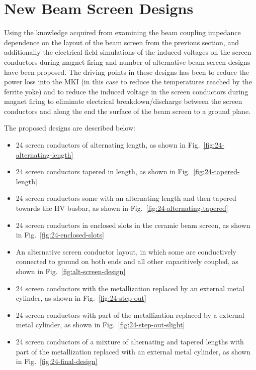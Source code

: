\section{New Beam Screen Designs}

Using the knowledge acquired from examining the beam coupling impedance dependence on the layout of the beam screen from the previous section, and additionally the electrical field simulations of the induced voltages on the screen conductors during magnet firing and number of alternative beam screen designs have been proposed. The driving points in these designs has been to reduce the power loss into the MKI (in this case to reduce the temperatures reached by the ferrite yoke) and to reduce the induced voltage in the screen conductors during magnet firing to eliminate electrical breakdown/discharge between the screen conductors and along the end the surface of the beam screen to a ground plane.

The proposed designs are described below:

\begin{itemize}
\item{24 screen conductors of alternating length, as shown in Fig.~\ref{fig:24-alternating-length}}
\item{24 screen conductors tapered in length, as shown in Fig.~\ref{fig:24-tapered-length}}
\item{24 screen conductors some with an alternating length and then tapered towards the HV busbar, as shown in Fig.~\ref{fig:24-alternating-tapered}}
\item{24 screen conductors in enclosed slots in the ceramic beam screen, as shown in Fig.~\ref{fig:24-enclosed-slots}}
\item{An alternative screen conductor layout, in which some are conductively connected to ground on both ends and all other capacitively coupled, as shown in Fig.~\ref{fig:alt-screen-design}}
\item{24 screen conductors with the metallization replaced by an external metal cylinder, as shown in Fig.~\ref{fig:24-step-out}}
\item{24 screen conductors with part of the metallization replaced by a external metal cylinder, as shown in Fig.~\ref{fig:24-step-out-slight}}
\item{24 screen conductors of a mixture of alternating and tapered lengths with part of the metallization replaced with an external metal cylinder, as shown in Fig.~\ref{fig:24-final-design}}
\end{itemize}

